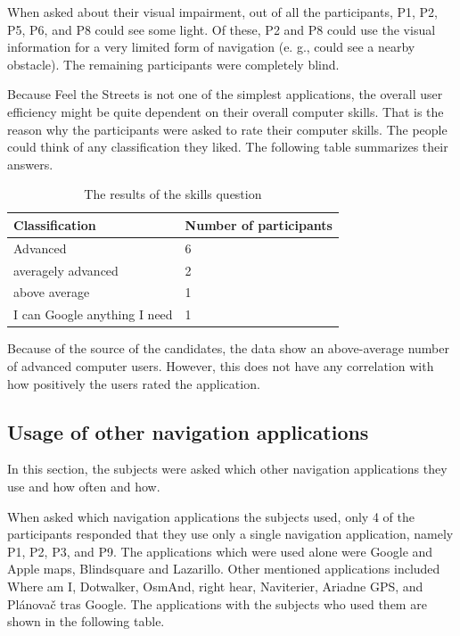 \documentclass[nolof,digital]{fithesis3}
\begin{document}
When asked about their visual impairment, out of all the participants, P1, P2, P5, P6, and P8 could see some light. Of these, P2 and P8 could use the visual information for a very limited form of navigation (e. g., could see a nearby obstacle). The remaining participants were completely blind.

Because Feel the Streets is not one of the simplest applications, the overall user efficiency might be quite dependent on their overall computer skills. That is the reason why the participants were asked to rate their computer skills. The people could think of any classification they liked. The following table summarizes their answers.
\begin{table}
\caption{The results of the skills question}
\begin{tabularx}{\textwidth}{ |X|X| }
Classification & Number of participants \\
\hline
Advanced & 6 \\
averagely advanced & 2 \\
above average & 1 \\
I can Google anything I need & 1 \\
\end{tabularx}
\end{table}
Because of the source of the candidates, the data show an above-average number of advanced computer users. However, this does not have any correlation with how positively the users rated the application.
\subsection{Usage of other navigation applications}
In this section, the subjects were asked which other navigation applications they use and how often and how.

When asked which navigation applications the subjects used, only 4 of the participants responded that they use only a single navigation application, namely P1, P2, P3, and P9. The applications which were used alone were Google and Apple maps, Blindsquare and Lazarillo. Other mentioned applications included Where am I, Dotwalker, OsmAnd, right hear, Naviterier, Ariadne GPS, and Plánovač tras Google. The applications with the subjects who used them are shown in the following table.
\end{document}
